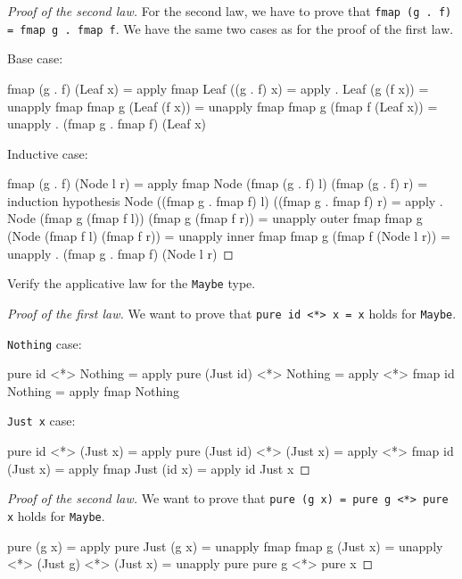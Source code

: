 \documentclass[12pt]{article}
\newenvironment{code}{\endgraf\verbatim}{\endverbatim}
\newenvironment{problem}[2][Problem]{\begin{trivlist}
\item[\hskip \labelsep {\bfseries #1}\hskip \labelsep {\bfseries #2.}]}{\end{trivlist}}
\begin{document}
\begin{proof}[Proof of the second law]
For the second law, we have to prove that \verb|fmap (g . f) = fmap g . fmap f|. We have the same two cases as for the proof of the first law.

Base case:

\begin{code}
  fmap (g . f) (Leaf x)
=   { apply fmap }
  Leaf ((g . f) x)
=   { apply . }
  Leaf (g (f x))
=   { unapply fmap }
  fmap g (Leaf (f x))
=   { unapply fmap }
  fmap g (fmap f (Leaf x))
=   { unapply . }
  (fmap g . fmap f) (Leaf x)
\end{code}

Inductive case:

\begin{code}
  fmap (g . f) (Node l r)
=   { apply fmap }
  Node (fmap (g . f) l) (fmap (g . f) r)
=   { induction hypothesis }
  Node ((fmap g . fmap f) l) ((fmap g . fmap f) r)
=   { apply . }
  Node (fmap g (fmap f l)) (fmap g (fmap f r))
=   { unapply outer fmap }
  fmap g (Node (fmap f l) (fmap f r))
=   { unapply inner fmap }
  fmap g (fmap f (Node l r)) 
=   { unapply . }
  (fmap g . fmap f) (Node l r)
\end{code}
\end{proof}


\begin{problem}{4}
Verify the applicative law for the \verb|Maybe| type.
\end{problem}

\begin{proof}[Proof of the first law]
We want to prove that \verb|pure id <*> x = x| holds for \verb|Maybe|.

\verb|Nothing| case:

\begin{code}
  pure id <*> Nothing
=   { apply pure }
  (Just id) <*> Nothing
=   { apply <*> }
  fmap id Nothing
=   { apply fmap }
  Nothing
\end{code}

\verb|Just x| case:

\begin{code}
  pure id <*> (Just x)
=   { apply pure }
  (Just id) <*> (Just x)
=   { apply <*> }
  fmap id (Just x)
=   { apply fmap }
  Just (id x)
=   { apply id }
  Just x
\end{code}
\end{proof}

\begin{proof}[Proof of the second law]
We want to prove that \verb|pure (g x) = pure g <*> pure x| holds for \verb|Maybe|.

\begin{code}
  pure (g x)
=   { apply pure }
  Just (g x)
=   { unapply fmap }
  fmap g (Just x)
=   { unapply <*> }
  (Just g) <*> (Just x)
=   { unapply pure }
  pure g <*> pure x
\end{code}
\end{proof}
\end{document}

